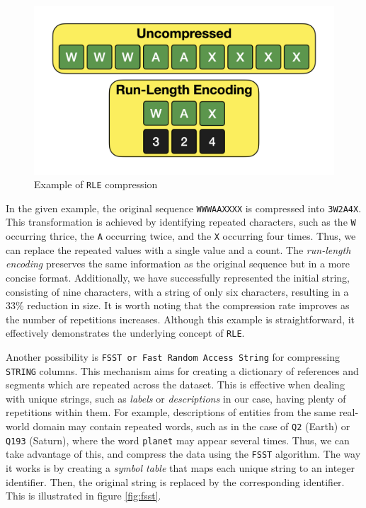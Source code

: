 \begin{figure}[ht]
    \centering
    \includegraphics[width=.8\linewidth]{figures/diagrams/10-2_rle.png}
    \caption[Example of \texttt{RLE} compression]{Example of \texttt{RLE} compression \cite{Raasveldt_2022}}
    \label{fig:rle}
\end{figure}

In the given example, the original sequence \texttt{WWWAAXXXX} is compressed into \texttt{3W2A4X}. This transformation is achieved by identifying repeated characters, such as the \texttt{W} occurring thrice, the \texttt{A} occurring twice, and the \texttt{X} occurring four times. Thus, we can replace the repeated values with a single value and a count. The \textit{run-length encoding} preserves the same information as the original sequence but in a more concise format. Additionally, we have successfully represented the initial string, consisting of nine characters, with a string of only six characters, resulting in a 33\% reduction in size. It is worth noting that the compression rate improves as the number of repetitions increases. Although this example is straightforward, it effectively demonstrates the underlying concept of \texttt{RLE}.

Another possibility is \texttt{FSST or Fast Random Access String} for compressing \texttt{STRING} columns. This mechanism aims for creating a dictionary of references and segments which are repeated across the dataset. This is effective when dealing with unique strings, such as \textit{labels} or \textit{descriptions} in our case, having plenty of repetitions within them. For example, descriptions of entities from the same real-world domain may contain repeated words, such as in the case of \texttt{Q2} (Earth) or \texttt{Q193} (Saturn), where the word \texttt{planet} may appear several times. Thus, we can take advantage of this, and compress the data using the \texttt{FSST} algorithm. The way it works is by creating a \textit{symbol table} that maps each unique string to an integer identifier. Then, the original string is replaced by the corresponding identifier. This is illustrated in figure \ref{fig:fsst}.

